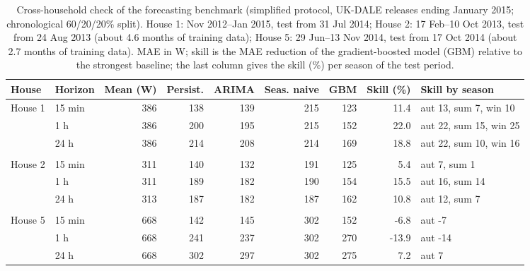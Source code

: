 \begin{table}[H]
\centering
\caption{Cross-household check of the forecasting benchmark (simplified protocol, UK-DALE releases ending January 2015; chronological 60/20/20\% split). House 1: Nov 2012--Jan 2015, test from 31 Jul 2014; House 2: 17 Feb--10 Oct 2013, test from 24 Aug 2013 (about 4.6 months of training data); House 5: 29 Jun--13 Nov 2014, test from 17 Oct 2014 (about 2.7 months of training data). MAE in W; skill is the MAE reduction of the gradient-boosted model (GBM) relative to the strongest baseline; the last column gives the skill (\%) per season of the test period.}
\label{tab:forecast_houses}
\scriptsize
\begin{tabular}{@{}llrrrrrrl@{}}
\toprule
House & Horizon & Mean (W) & Persist. & ARIMA & Seas. naive & GBM & Skill (\%) & Skill by season \\
\midrule
House 1 & 15 min & 386 & 138 & 139 & 215 & 123 & 11.4 & aut 13, sum 7, win 10 \\
 & 1 h & 386 & 200 & 195 & 215 & 152 & 22.0 & aut 22, sum 15, win 25 \\
 & 24 h & 386 & 214 & 208 & 214 & 169 & 18.8 & aut 22, sum 10, win 16 \\
\midrule \\
House 2 & 15 min & 311 & 140 & 132 & 191 & 125 & 5.4 & aut 7, sum 1 \\
 & 1 h & 311 & 189 & 182 & 190 & 154 & 15.5 & aut 16, sum 14 \\
 & 24 h & 313 & 187 & 182 & 187 & 162 & 10.8 & aut 12, sum 7 \\
\midrule \\
House 5 & 15 min & 668 & 142 & 145 & 302 & 152 & -6.8 & aut -7 \\
 & 1 h & 668 & 241 & 237 & 302 & 270 & -13.9 & aut -14 \\
 & 24 h & 668 & 302 & 297 & 302 & 275 & 7.2 & aut 7 \\
\bottomrule
\end{tabular}
\end{table}

